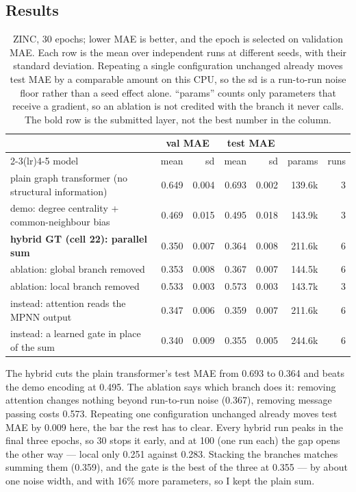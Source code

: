 \subsection*{Results}

\begin{table}[H]
  \centering
  \small
  \caption{ZINC, 30 epochs; lower MAE is better, and the epoch is selected on validation
           MAE. Each row is the mean over independent runs at different seeds, with their
           standard deviation. Repeating a single configuration unchanged already moves test
           MAE by a comparable amount on this CPU, so the sd is a run-to-run noise floor
           rather than a seed effect alone. ``params'' counts only parameters that receive a
           gradient, so an ablation is not credited with the branch it never calls. The
           bold row is the submitted layer, not the best number in the column.}
  \label{p2:tab:zinc}
  \begin{tabular}{lrrrrrr}
    \toprule
    & \multicolumn{2}{c}{val MAE} & \multicolumn{2}{c}{test MAE} & & \\
    \cmidrule(lr){2-3}\cmidrule(lr){4-5}
    model & mean & sd & mean & sd & params & runs \\
    \midrule
    plain graph transformer (no structural information) & 0.649 & 0.004 & 0.693 & 0.002 & 139.6k & 3 \\
    demo: degree centrality + common-neighbour bias & 0.469 & 0.015 & 0.495 & 0.018 & 143.9k & 3 \\
    \midrule
    \textbf{hybrid GT (cell 22): parallel sum} & 0.350 & 0.007 & 0.364 & 0.008 & 211.6k & 6 \\
    \quad ablation: global branch removed & 0.353 & 0.008 & 0.367 & 0.007 & 144.5k & 6 \\
    \quad ablation: local branch removed & 0.533 & 0.003 & 0.573 & 0.003 & 143.7k & 3 \\
    \midrule
    \quad instead: attention reads the MPNN output & 0.347 & 0.006 & 0.359 & 0.007 & 211.6k & 6 \\
    \quad instead: a learned gate in place of the sum & 0.340 & 0.009 & 0.355 & 0.005 & 244.6k & 6 \\
    \bottomrule
  \end{tabular}
\end{table}

The hybrid cuts the plain transformer's test MAE from 0.693 to 0.364 and beats the
demo encoding at 0.495. The ablation says which branch does it: removing attention
changes nothing beyond run-to-run noise (0.367), removing message passing costs
0.573. Repeating one configuration unchanged already moves test MAE by 0.009 here,
the bar the rest has to clear. Every hybrid run peaks in the final three epochs, so 30 stops
it early, and at 100 (one run each) the gap opens the other way --- local only 0.251 against 0.283. Stacking the branches matches summing them (0.359), and the gate is
the best of the three at 0.355 --- by about one noise width, and with 16\% more
parameters, so I kept the plain sum.

